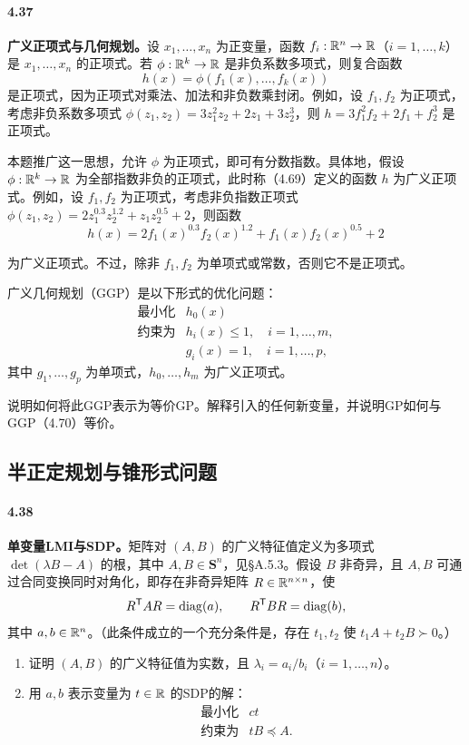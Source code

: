 \paragraph{4.37}\textbf{广义正项式与几何规划。}设 $x_1,\ldots,x_n$ 为正变量，函数 $f_i:\mathbb R^n\to\mathbb R$（$i=1,\ldots,k$）是 $x_1,\ldots,x_n$ 的正项式。若 $\phi:\mathbb R^k\to\mathbb R$ 是非负系数多项式，则复合函数
\begin{equation}
h(x)=\phi(f_1(x),\ldots,f_k(x))\tag{4.69}
\end{equation}
是正项式，因为正项式对乘法、加法和非负数乘封闭。例如，设 $f_1,f_2$ 为正项式，考虑非负系数多项式 $\phi(z_1,z_2)=3z_1^2z_2+2z_1+3z_2^3$，则 $h=3f_1^2f_2+2f_1+f_2^3$ 是正项式。

本题推广这一思想，允许 $\phi$ 为正项式，即可有分数指数。具体地，假设 $\phi:\mathbb R^k\to\mathbb R$ 为全部指数非负的正项式，此时称（4.69）定义的函数 $h$ 为广义正项式。例如，设 $f_1,f_2$ 为正项式，考虑非负指数正项式 $\phi(z_1,z_2)=2z_1^{0.3}z_2^{1.2}+z_1z_2^{0.5}+2$，则函数
\[
h(x)=2f_1(x)^{0.3}f_2(x)^{1.2}+f_1(x)f_2(x)^{0.5}+2
\]

为广义正项式。不过，除非 $f_1,f_2$ 为单项式或常数，否则它不是正项式。

广义几何规划（GGP）是以下形式的优化问题：
\begin{equation}
\begin{array}{ll}\text{最小化}&h_0(x)\\\text{约束为}&h_i(x)\le1,\quad i=1,\ldots,m,\\&g_i(x)=1,\quad i=1,\ldots,p,\end{array}\tag{4.70}
\end{equation}
其中 $g_1,\ldots,g_p$ 为单项式，$h_0,\ldots,h_m$ 为广义正项式。

说明如何将此GGP表示为等价GP。解释引入的任何新变量，并说明GP如何与GGP（4.70）等价。

\subsection*{半正定规划与锥形式问题}
\paragraph{4.38}\textbf{单变量LMI与SDP。}矩阵对 $(A,B)$ 的广义特征值定义为多项式 $\det(\lambda B-A)$ 的根，其中 $A,B\in\mathbf S^n$，见§A.5.3。假设 $B$ 非奇异，且 $A,B$ 可通过合同变换同时对角化，即存在非奇异矩阵 $R\in\mathbb R^{n\times n}$，使
\[
R^\mathsf T AR=\operatorname{diag}(a),\qquad R^\mathsf T BR=\operatorname{diag}(b),
\]
其中 $a,b\in\mathbb R^n$。（此条件成立的一个充分条件是，存在 $t_1,t_2$ 使 $t_1A+t_2B\succ0$。）
\begin{enumerate}[label=(\alph*)]
\item 证明 $(A,B)$ 的广义特征值为实数，且 $\lambda_i=a_i/b_i$（$i=1,\ldots,n$）。
\item 用 $a,b$ 表示变量为 $t\in\mathbb R$ 的SDP的解：
\[
\begin{array}{ll}\text{最小化}&ct\\\text{约束为}&tB\preceq A.\end{array}
\]
\end{enumerate}

